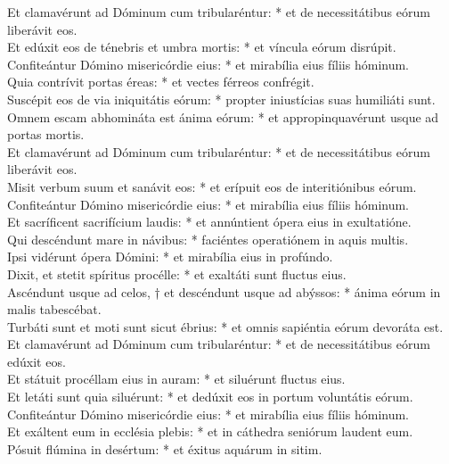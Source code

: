 {	Et clamavérunt ad Dóminum cum tribularéntur: * et de necessitátibus eórum liberávit eos. \\
	Et edúxit eos de ténebris et umbra mortis: * et víncula eórum disrúpit. \\
	Confiteántur Dómino misericórdie eius: * et mirabília eius fíliis hóminum. \\
	Quia contrívit portas éreas: * et vectes férreos confrégit. \\
	Suscépit eos de via iniquitátis eórum: * propter iniustícias suas humiliáti sunt. \\
	Omnem escam abhomináta est ánima eórum: * et appropinquavérunt usque ad portas mortis. \\
	Et clamavérunt ad Dóminum cum tribularéntur: * et de necessitátibus eórum liberávit eos. \\
	Misit verbum suum et sanávit eos: * et erípuit eos de interitiónibus eórum. \\
	Confiteántur Dómino misericórdie eius: * et mirabília eius fíliis hóminum. \\
	Et sacríficent sacrifícium laudis: * et annúntient ópera eius in exultatióne. \\
	Qui descéndunt mare in návibus: * faciéntes operatiónem in aquis multis. \\
	Ipsi vidérunt ópera Dómini: * et mirabília eius in profúndo. \\
	Dixit, et stetit spíritus procélle: * et exaltáti sunt fluctus eius. \\
	Ascéndunt usque ad celos, † et descéndunt usque ad abýssos: * ánima eórum in malis tabescébat. \\
	Turbáti sunt et moti sunt sicut ébrius: * et omnis sapiéntia eórum devoráta est. \\
	Et clamavérunt ad Dóminum cum tribularéntur: * et de necessitátibus eórum edúxit eos. \\
	Et státuit procéllam eius in auram: * et siluérunt fluctus eius. \\
	Et letáti sunt quia siluérunt: * et dedúxit eos in portum voluntátis eórum. \\
	Confiteántur Dómino misericórdie eius: * et mirabília eius fíliis hóminum. \\
	Et exáltent eum in ecclésia plebis: * et in cáthedra seniórum laudent eum. \\
	Pósuit flúmina in desértum: * et éxitus aquárum in sitim. \\
}
